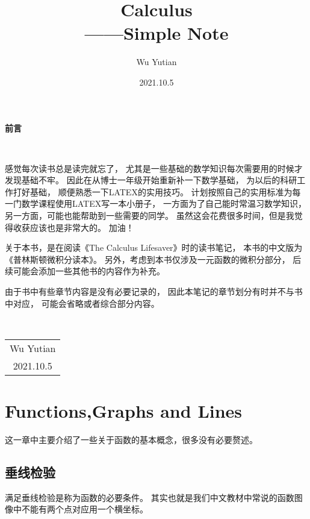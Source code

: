 \documentclass[11pt, b5paper, oneside]{book}
\title{{\Huge{\textbf{Calculus}}}\\——Simple Note}
\author{Wu Yutian}
\date{2021.10.5}
\begin{document}
\maketitle

\setcounter{page}{1}

\begin{center}
    \Huge\textbf{前言}
\end{center}~\

感觉每次读书总是读完就忘了，
尤其是一些基础的数学知识每次需要用的时候才发现基础不牢。
因此在从博士一年级开始重新补一下数学基础，
为以后的科研工作打好基础，
顺便熟悉一下LATEX的实用技巧。
计划按照自己的实用标准为每一门数学课程使用LATEX写一本小册子，
一方面为了自己能时常温习数学知识，
另一方面，可能也能帮助到一些需要的同学。
虽然这会花费很多时间，但是我觉得收获应该也是非常大的。
加油！

关于本书，是在阅读《The Calculus Lifesaver》时的读书笔记，
本书的中文版为《普林斯顿微积分读本》。
另外，考虑到本书仅涉及一元函数的微积分部分，
后续可能会添加一些其他书的内容作为补充。

由于书中有些章节内容是没有必要记录的，
因此本笔记的章节划分有时并不与书中对应，
可能会省略或者综合部分内容。

~\\
\begin{flushright}
    \begin{tabular}{c}
        Wu Yutian\\
        2021.10.5
    \end{tabular}
\end{flushright}

\newpage
{}
\setcounter{page}{1}
\tableofcontents
\newpage
\setcounter{page}{1}

\chapter{Functions,Graphs and Lines}

这一章中主要介绍了一些关于函数的基本概念，很多没有必要赘述。

\section{垂线检验}

满足垂线检验是称为函数的必要条件。
其实也就是我们中文教材中常说的函数图像中不能有两个点对应用一个横坐标。
\end{document}

